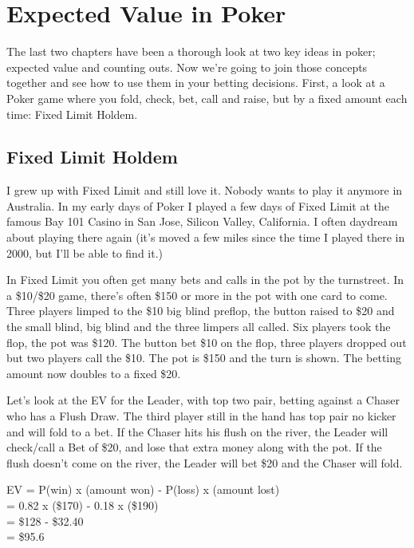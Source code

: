 \chapter{Expected Value in Poker}

The last two chapters have been a thorough look at two key ideas in
poker; expected value and counting outs. Now we're going to join
those concepts together and see how to use them in your betting
decisions. First, a look at a Poker game where you fold, check, bet,
call and raise, but by a fixed amount each time: Fixed Limit Holdem.

\section{Fixed Limit Holdem}

I grew up with Fixed Limit and still love it. Nobody wants to play it
anymore in Australia. In my early days of Poker I played a few days of
Fixed Limit at the famous Bay 101 Casino in San Jose, Silicon Valley,
California. I often daydream about playing there again (it's moved a
few miles since the time I played there in 2000, but I'll be able to
find it.)

In Fixed Limit you often get many bets and calls in the pot by the
turnstreet. In a \$10/\$20 game, there's often \$150 or more in the
pot with one card to come. Three players limped to the
\$10 big blind preflop, the button raised to \$20 and the small blind,
big blind and the three limpers all called. Six players took the flop,
the pot was \$120. The button bet \$10 on the flop, three players
dropped out but two players call the \$10. The pot is \$150 and the turn is
shown. The betting amount now doubles to a fixed \$20.

Let's look at the EV for the Leader, with top two
pair, betting against a Chaser who has a Flush Draw. The third player
still in the hand has top pair no kicker and will fold to a bet.
If the Chaser hits his flush on the river, the Leader will check/call
a Bet of \$20, and lose that extra money along with the pot. If the
flush doesn't come on the river, the Leader will bet \$20 and the
Chaser will fold.


EV = P(win) x (amount won) - P(loss) x (amount lost) \\
   = 0.82   x (\$170)      - 0.18    x (\$190) \\
   = \$128 - \$32.40 \\
   = \$95.6

